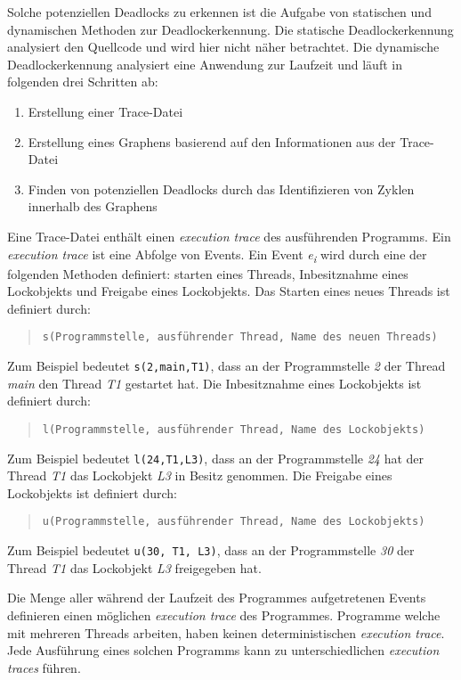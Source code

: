 Solche potenziellen Deadlocks zu erkennen ist die Aufgabe von statischen und
dynamischen Methoden zur Deadlockerkennung. Die statische Deadlockerkennung
analysiert den Quellcode und wird hier nicht näher betrachtet. Die dynamische
Deadlockerkennung analysiert eine Anwendung zur Laufzeit und läuft in folgenden
drei Schritten ab:
\begin{enumerate}
  \item Erstellung einer Trace-Datei
  \item Erstellung eines Graphens basierend auf den Informationen aus der
  Trace-Datei
  \item Finden von potenziellen Deadlocks durch das Identifizieren von Zyklen
  innerhalb des Graphens
\end{enumerate}

Eine Trace-Datei enthält einen \textit{execution trace} des ausführenden
Programms. Ein \textit{execution trace} ist eine Abfolge von Events. Ein Event
\textit{e\textsubscript{i}} wird durch eine der folgenden Methoden definiert:
starten eines Threads, Inbesitznahme eines Lockobjekts und Freigabe eines
Lockobjekts. Das Starten eines neues Threads ist definiert durch:
\begin{quote}
\texttt{s(Programmstelle, ausführender Thread, Name des neuen Threads)}
\end{quote}
Zum Beispiel bedeutet \texttt{s(2,main,T1)}, dass an der Programmstelle
\textit{2} der Thread \textit{main} den Thread \textit{T1} gestartet hat. 
Die Inbesitznahme eines Lockobjekts ist definiert durch:
\begin{quote}
\texttt{l(Programmstelle, ausführender Thread, Name des Lockobjekts)}
\end{quote}
Zum Beispiel bedeutet \texttt{l(24,T1,L3)}, dass
an der Programmstelle \textit{24} hat der Thread \textit{T1} das Lockobjekt
\textit{L3} in Besitz genommen. Die Freigabe eines Lockobjekts ist definiert
durch:
\begin{quote}
\texttt{u(Programmstelle, ausführender Thread, Name des Lockobjekts)}
\end{quote}
Zum Beispiel bedeutet \texttt{u(30, T1, L3)}, dass an der Programmstelle
\textit{30} der Thread \textit{T1} das Lockobjekt \textit{L3} freigegeben hat.

Die Menge aller während der Laufzeit des Programmes aufgetretenen Events
definieren einen möglichen \textit{execution trace} des Programmes.
Programme welche mit mehreren Threads arbeiten, haben keinen deterministischen
\textit{execution trace}. Jede Ausführung eines solchen Programms kann zu
unterschiedlichen \textit{execution traces} führen. 

